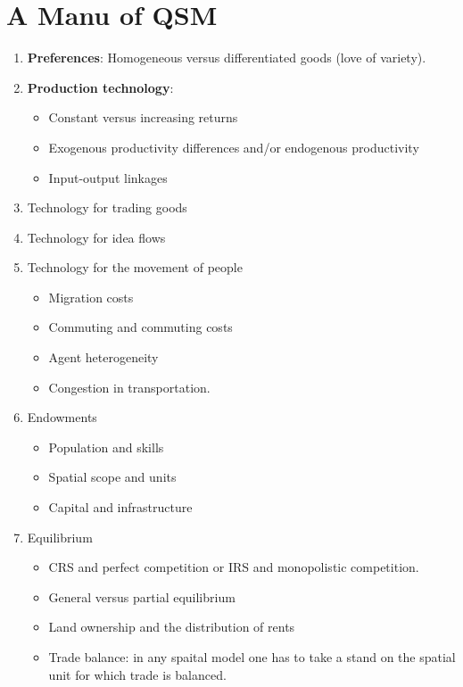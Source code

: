 \documentclass[11pt,a4paper]{article}
\begin{document}
\section{A Manu of QSM}
\begin{enumerate}
  \item \textbf{Preferences}: Homogeneous versus differentiated goods (love of variety).
  \item \textbf{Production technology}: \begin{itemize}
    \item Constant versus increasing returns 
    \item Exogenous productivity differences and/or endogenous productivity 
    \item Input-output linkages
  \end{itemize}
  \item Technology for trading goods 
  \item Technology for idea flows 
  \item Technology for the movement of people \begin{itemize}
    \item Migration costs 
    \item Commuting and commuting costs 
    \item Agent heterogeneity
    \item Congestion in transportation. 
  \end{itemize}
  \item Endowments \begin{itemize}
    \item Population and skills
    \item Spatial scope and units 
    \item Capital and infrastructure
  \end{itemize}
  \item Equilibrium \begin{itemize}
    \item CRS and perfect competition or IRS and monopolistic competition. 
    \item General versus partial equilibrium 
    \item Land ownership and the distribution of rents 
    \item Trade balance: in any spaital model one has to take a stand on the spatial unit for which trade is balanced. 
  \end{itemize}
\end{enumerate}
\end{document}
